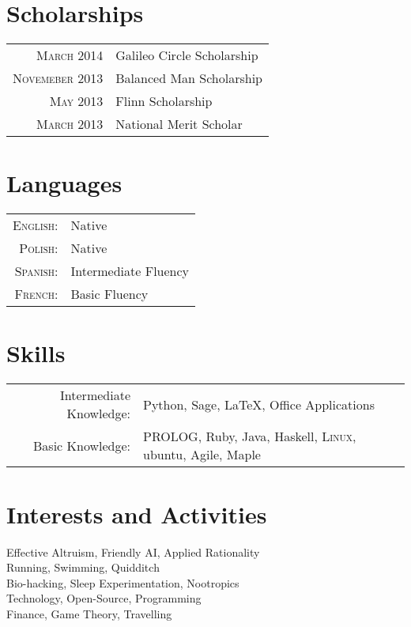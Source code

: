 \documentclass[a4paper,10pt]{article}
\begin{document}
\section{Scholarships} %
\begin{tabular}{rl}
	\textsc{March} 2014 & Galileo Circle Scholarship\\
	\textsc{Novemeber} 2013 & Balanced Man Scholarship\\
	\textsc{May} 2013 & Flinn Scholarship\\
	\textsc{March} 2013 & National Merit Scholar\\
\end{tabular}

\section{Languages}
\begin{tabular}{rl}
	\textsc{English:}&Native\\
	\textsc{Polish:}&Native\\
	\textsc{Spanish:}&Intermediate Fluency\\
	\textsc{French:}&Basic Fluency\\
\end{tabular}

\section{Skills}
\begin{tabular}{rl}
	Intermediate Knowledge:& Python, Sage, \LaTeX, Office Applications\\
	Basic Knowledge:& \textsc{PROLOG}, Ruby, Java, Haskell, \textsc{Linux}, ubuntu, Agile, Maple\\
\end{tabular}

\section{Interests and Activities}
Effective Altruism, Friendly AI, Applied Rationality\\
Running, Swimming, Quidditch\\
Bio-hacking, Sleep Experimentation, Nootropics\\
Technology, Open-Source, Programming\\
Finance, Game Theory, Travelling\\
\end{document}
